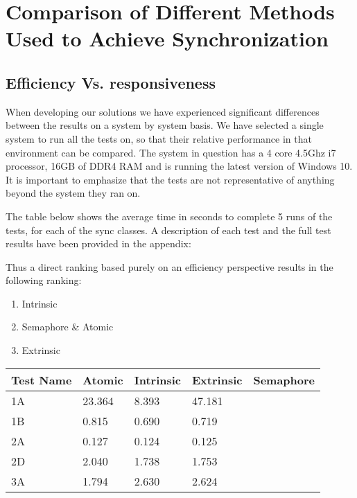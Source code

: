 \documentclass[11pt]{article}
\begin{document}
\maketitle
\tableofcontents
\thispagestyle{empty}
\pagebreak
\setcounter{page}{1}
\section{Comparison of Different Methods Used to Achieve Synchronization}

\subsection{Efficiency Vs. responsiveness}


When developing our solutions we have experienced significant differences between the results on a system by system basis. We have selected a single system to run all the tests on, so that their relative performance in that environment can be compared. The system in question has a 4 core 4.5Ghz i7 processor, 16GB of DDR4 RAM and is running the latest version of Windows 10. It is important to emphasize that the tests are not representative of anything beyond the system they ran on.

The table below shows the average time in seconds to complete 5 runs of the tests, for each of the sync classes. A description of each test and the full test results have been provided in the appendix: 

Thus a direct ranking based purely on an efficiency perspective results in the following ranking: 

\begin{enumerate}
	\item Intrinsic
	\item Semaphore \& Atomic
	\item Extrinsic
\end{enumerate}


\begin{table}[H]
\begin{tabular}{|l|l|l|l|l|}
\hline
Test Name & Atomic & Intrinsic & Extrinsic & Semaphore \\ \hline
1A        & 23.364 & 8.393     & 47.181    &           \\ \hline
1B        & 0.815  & 0.690     & 0.719     &           \\ \hline
2A        & 0.127  & 0.124     & 0.125     &           \\ \hline
2D        & 2.040  & 1.738     & 1.753     &           \\ \hline
3A        & 1.794  & 2.630     & 2.624     &           \\ \hline
\end{tabular}
\end{table}
\end{document}
